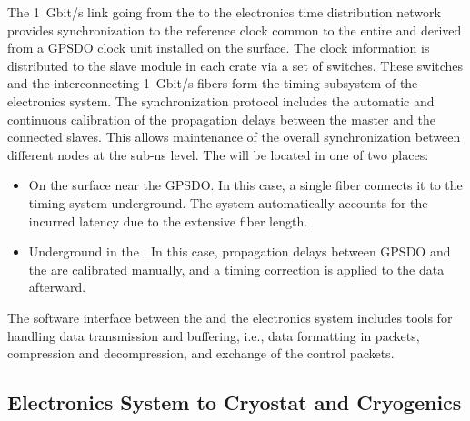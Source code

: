 The \SI{1}{Gbit/s} link going from the  to the \dual electronics time distribution network provides synchronization to the reference clock common %
to the entire  and derived from a GPSDO clock unit installed on the surface. The clock information is distributed to the  slave module in each  crate via a set of  switches. These switches and the interconnecting \SI{1}{Gbit/s} fibers form the timing subsystem of the \dual electronics system. %
The  synchronization protocol includes the automatic and continuous calibration of the propagation delays between the master and the connected slaves. This allows maintenance of the  overall synchronization between different nodes at the sub-ns level. The  will be located in one of two places:
\begin{itemize}
\item{On the surface near the GPSDO. In this case, a single fiber connects it to the \dual timing system underground. The system automatically accounts for the incurred latency due to the extensive fiber length.}
\item{Underground in the . In this case, propagation delays between GPSDO and the  are calibrated manually, and a timing correction is applied to the data afterward.}
\end{itemize} 


The software interface between the  and the electronics system includes tools for handling data transmission and buffering, i.e.,  data formatting in  packets, compression and decompression, and exchange of the control packets.

\subsection{Electronics System to Cryostat and Cryogenics}
\label{ssec:dp-tpcelec-intfc-cryo}

